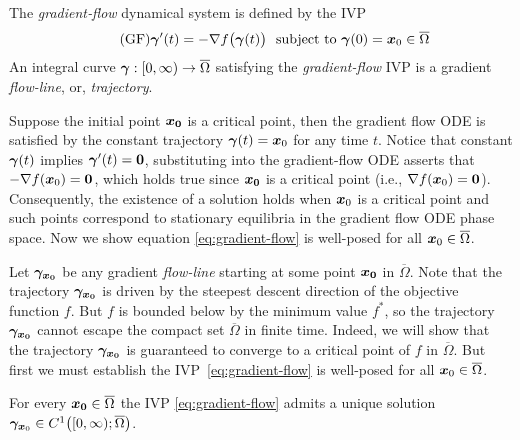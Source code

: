 \documentclass[10pt]{article}
\begin{document}
        \begin{definition}
            \label{def:grad-flow}
            The \emph{gradient‐flow} dynamical system is defined by the IVP 
            \begin{equation}
                \label{eq:gradient-flow}\tag{GF}
                \bm{\gamma}'(t) = -\nabla f\bigl(\bm{\gamma}(t)\bigr) ~\text{ subject to } \bm{\gamma}(0) = \bm{x}_0 \in \overline\Omega
            \end{equation}
            An integral curve $\bm{\gamma}:[0,\infty)\to\overline{\Omega}$ satisfying the \emph{gradient-flow} IVP is a gradient \emph{flow-line}, or, \emph{trajectory}.
        \end{definition}

        Suppose the initial point $\bm{x_0}$ is a critical point, then the gradient flow ODE 
        is satisfied by the constant trajectory $\bm{\gamma}(t) = \bm{x}_0$ for any time $t$. 
        Notice that constant $\bm{\gamma}(t)$ implies $\bm{\gamma}'(t) = \bm{0}$, substituting
        into the gradient-flow ODE asserts that $-\nabla f(\bm{x}_0) = \bm{0}$, which holds true
        since $\bm{x_0}$ is a critical point (i.e., $\nabla f(\bm{x}_0) = \bm{0}$).
        Consequently, the existence of a solution holds when $\bm{x}_0$ is a critical point
        and such points correspond to stationary equilibria in the gradient flow ODE phase space.
        Now we show equation \eqref{eq:gradient-flow} is well-posed for all $\bm{x}_0 \in \overline{\Omega}$.

        Let $\bm{\gamma}_{\bm{x_0}}$ be any gradient \emph{flow-line} starting at
        some point $\bm{x_0}$ in $\overline{\Omega}$. Note that the trajectory $\bm{\gamma}_{\bm{x_0}}$ 
        is driven by the steepest descent direction of the objective function $f$. But $f$ is bounded
        below by the minimum value $f^*$, so the trajectory $\bm{\gamma}_{\bm{x_0}}$ cannot
        escape the compact set $\overline{\Omega}$ in finite time. Indeed, we will show that the trajectory 
        $\bm{\gamma}_{\bm{x_0}}$ is guaranteed to converge to a critical point of $f$ in $\overline{\Omega}$.
        But first we must establish the IVP~\eqref{eq:gradient-flow} is well-posed for all $\bm{x}_0 \in \overline{\Omega}$.

        \begin{theorem}[Existence]\label{thm:gf-existence}
            For every $\bm{x_0}\in \overline{\Omega}$ the IVP \eqref{eq:gradient-flow} admits a
            unique solution $\bm{\gamma}_{\bm{x}_0}\in C^{1}\bigl([0,\infty);\overline{\Omega}\bigr)$.
        \end{theorem}
\end{document}

